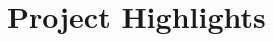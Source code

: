 \documentclass[]{Nikhil_Kadiyan_Resume}
\begin{document}
\section{Project Highlights}
\hrulefill




\end{document}
